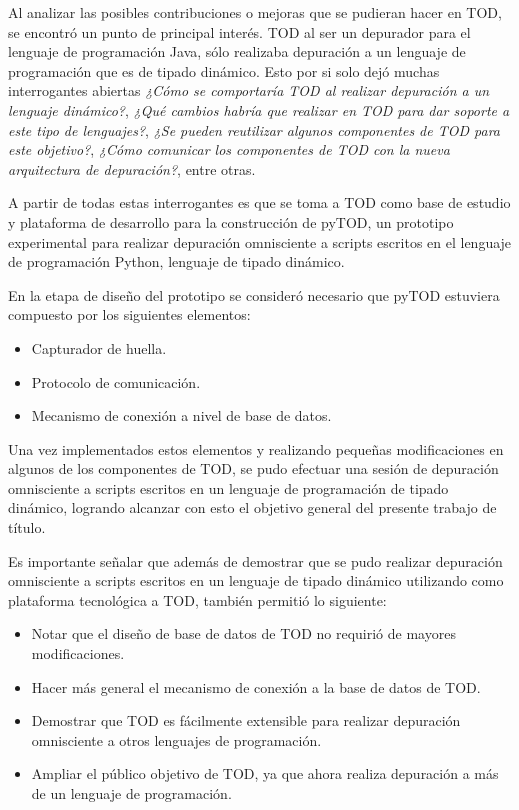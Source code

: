 \documentclass[12pt,legalpaper]{report}
\begin{document}
Al analizar las posibles contribuciones o mejoras que se pudieran hacer en TOD, se encontró un punto de principal interés.  TOD al ser un depurador para el lenguaje de programación Java, sólo realizaba depuración a un lenguaje de programación que es de tipado dinámico.  Esto por si solo dejó muchas interrogantes abiertas \textit{¿Cómo se comportaría TOD al realizar depuración a un lenguaje dinámico?}, \textit{¿Qué cambios habría que realizar en TOD para dar soporte a este tipo de lenguajes?}, \textit{¿Se pueden reutilizar algunos componentes de TOD para este objetivo?}, \textit{¿Cómo comunicar los componentes de TOD con la nueva arquitectura de depuración?}, entre otras.

A partir de todas estas interrogantes es que se toma a TOD como base de estudio y plataforma de desarrollo para la construcción de pyTOD, un prototipo experimental para realizar depuración omnisciente a scripts escritos en el lenguaje de programación Python, lenguaje de tipado dinámico.


En la etapa de diseño del prototipo se consideró necesario que pyTOD estuviera compuesto por los siguientes elementos:

\begin{itemize}
	\item Capturador de huella.
	\item Protocolo de comunicación.
	\item Mecanismo de conexión a nivel de base de datos.
\end{itemize}

Una vez implementados estos elementos y realizando pequeñas modificaciones en algunos de los componentes de TOD, se pudo efectuar una sesión de depuración omnisciente a scripts escritos en un lenguaje de programación de tipado dinámico, logrando alcanzar con esto el objetivo general del presente trabajo de título.

Es importante señalar que además de demostrar que se pudo realizar depuración omnisciente a scripts escritos en un lenguaje de tipado dinámico utilizando como plataforma tecnológica a TOD, también permitió lo siguiente:

\begin{itemize}
	\item Notar que el diseño de base de datos de TOD no requirió de mayores modificaciones.
	\item Hacer más general el mecanismo de conexión a la base de datos de TOD.
	\item Demostrar que TOD es fácilmente extensible para realizar depuración omnisciente a otros lenguajes de programación.
	 \item Ampliar el público objetivo de TOD, ya que ahora realiza depuración a más de un lenguaje de programación.
\end{itemize}
\end{document}
